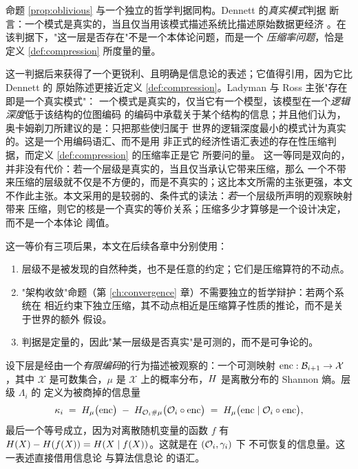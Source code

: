 \begin{remark}[模式实在性的判据]\label{rmk:dennett}
命题 \ref{prop:oblivious} 与一个独立的哲学判据同构。Dennett 的\emph{真实模式}判据
断言：一个模式是真实的，当且仅当用该模式描述系统比描述原始数据更经济
\cite{dennett1991}。在该判据下，"这一层是否存在"不是一个本体论问题，而是一个
\emph{压缩率问题}，恰是定义 \ref{def:compression} 所度量的量。

这一判据后来获得了一个更锐利、且明确是信息论的表述；它值得引用，因为它比 Dennett 的
原始陈述更接近定义 \ref{def:compression}。Ladyman 与 Ross 主张"存在即是一个真实模式"：
一个模式是真实的，仅当它有一个模型，该模型在一个\emph{逻辑深度}低于该结构的位图编码
的编码中承载关于某个结构的信息；并且他们认为，奥卡姆剃刀所建议的是：只把那些使归属于
世界的逻辑深度最小的模式计为真实的\cite{ladyman2007}。这是一个用编码语汇、而不是用
非正式的经济性语汇表述的存在性压缩判据，而定义 \ref{def:compression} 的压缩率正是它
所要问的量。
这一等同是双向的，并非没有代价：若一个层级是真实的，当且仅当承认它带来压缩，那么
一个不带来压缩的层级就不仅是不方便的，而是不真实的；这比本文所需的主张更强，本文
不作此主张。本文采用的是较弱的、条件式的读法：\emph{若}一个层级所声明的观察映射带来
压缩，则它的核是一个真实的等价关系；压缩多少才算够是一个设计决定，而不是一个本体论
阈值。

这一等价有三项后果，本文在后续各章中分别使用：
\begin{enumerate}[label=(\alph*)]
\item 层级不是被发现的自然种类，也不是任意的约定；它们是压缩算符的不动点。
\item "架构收敛"命题（第 \ref{ch:convergence} 章）不需要独立的哲学辩护：若两个系统在
      相近约束下独立压缩，其不动点相近是压缩算子性质的推论，而不是关于世界的额外
      假设。
\item 判据是定量的，因此"某一层级是否真实"是可测的，而不是可争论的。
\end{enumerate}
\end{remark}

\begin{definition}[压缩率]\label{def:compression}
设下层是经由一个\emph{有限编码}的行为描述被观察的：一个可测映射
$\mathrm{enc} : \mathcal{B}_{i+1} \to \mathcal{X}$，其中 $\mathcal{X}$ 是可数集合，$\mu$ 是
$\mathcal{X}$ 上的概率分布，$H$ 是离散分布的 Shannon 熵。层级 $\Lambda_i$ 的
定义为被商掉的信息量
\begin{equation}\label{eq:compression}
\kappa_i \;=\; H_{\mu}\bigl(\mathrm{enc}\bigr) \;-\;
H_{\mathcal{O}_i \# \mu}\bigl(\mathcal{O}_i \circ \mathrm{enc}\bigr)
\;=\; H_{\mu}\bigl(\mathrm{enc} \mid \mathcal{O}_i \circ \mathrm{enc}\bigr),
\end{equation}
最后一个等号成立，因为对离散随机变量的函数 $f$ 有
$H(X) - H(f(X)) = H(X \mid f(X))$。这就是在 $(\mathcal{O}_i, \gamma_i)$ 下
不可恢复的信息量。这一表述直接借用信息论 \cite{shannon1948}与算法信息论
\cite{kolmogorov1965}的语汇。
\end{definition}

